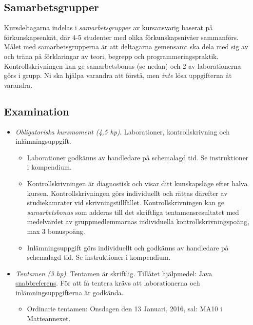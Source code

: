 \subsection{Samarbetsgrupper}\label{samarbetsgrupper}

Kursdeltagarna indelas i \emph{samarbetsgrupper} av kursansvarig baserat
på förkunskapsenkät, där 4-5 studenter med olika förkunskapsnivåer
sammanförs. Målet med samarbetsgrupperna är att deltagarna gemensamt ska
dela med sig av och träna på förklaringar av teori, begrepp och
programmeringspraktik. Kontrollskrivningen kan ge samarbetsbonus (se
nedan) och 2 av laborationerna görs i grupp. Ni ska hjälpa varandra att
förstå, men \emph{inte} lösa uppgifterna åt varandra.

\subsection{Examination}\label{examination}

\begin{itemize}
\item
  \emph{Obligatoriska kursmoment (4,5 hp)}. Laborationer,
  kontrollskrivning och inlämningsuppgift.

  \begin{itemize}
  \item
    Laborationer godkänns av handledare på schemalagd tid. Se
    instruktioner i kompendium.
  \item
    Kontrollskrivningen är diagnostisk och visar ditt kunskapsläge efter
    halva kursen. Kontrollskrivningen görs individuellt och rättas
    därefter av studiekamrater vid skrivningstillfället.
    Kontrollskrivningen kan ge \emph{samarbetsbonus} som adderas till
    det skriftliga tentamensresultatet med medelvärdet av
    gruppmedlemmarnas individuella kontrollskrivningspoäng, max 3
    bonuspoäng.
  \item
    Inlämningsuppgift görs individuellt och godkänns av handledare på
    schemalagd tid. Se instruktioner i kompendium.
  \end{itemize}
\item
  \emph{Tentamen (3 hp)}. Tentamen är skriftlig. Tillåtet hjälpmedel:
  Java \href{http://cs.lth.se/eda016/javaref}{snabbreferens}. För att få
  tentera krävs att laborationerna och inlämningsuppgifterna är
  godkända.

  \begin{itemize}
  \itemsep1pt\parskip0pt
  \item
    Ordinarie tentamen: Onsdagen den 13 Januari, 2016, sal: MA10 i
    Matteannexet.
  \end{itemize}
\end{itemize}

